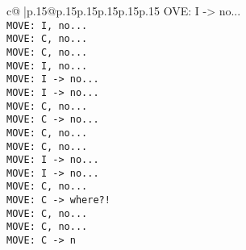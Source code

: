 \documentclass{article}
\begin{document}
{\begin{supertabular}{c@{$\;$}|p{.15\linewidth}@{}p{.15\linewidth}p{.15\linewidth}p{.15\linewidth}p{.15\linewidth}p{.15\linewidth}}
{{{OVE: I -> no...\\ \tt  MOVE: I, no...\\ \tt  MOVE: C, no...\\ \tt  MOVE: C, no...\\ \tt  MOVE: I, no...\\ \tt  MOVE: I -> no...\\ \tt  MOVE: I -> no...\\ \tt  MOVE: C, no...\\ \tt  MOVE: C -> no...\\ \tt  MOVE: C, no...\\ \tt  MOVE: C, no...\\ \tt  MOVE: I -> no...\\ \tt  MOVE: I -> no...\\ \tt  MOVE: C, no...\\ \tt  MOVE: C -> where?!\\ \tt  MOVE: C, no...\\ \tt  MOVE: C, no...\\ \tt  MOVE: C -> n}}}
\end{supertabular}}
\end{document}
